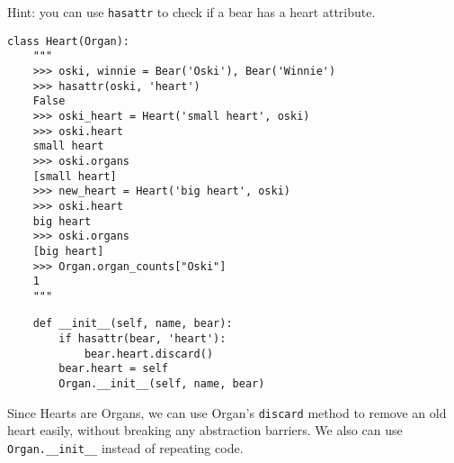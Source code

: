 \begin{parts}
\begin{blocksection}
Hint: you can use \lstinline{hasattr} to check if a bear has a heart attribute.

\begin{lstlisting}
class Heart(Organ):
    """
    >>> oski, winnie = Bear('Oski'), Bear('Winnie')
    >>> hasattr(oski, 'heart')
    False
    >>> oski_heart = Heart('small heart', oski)
    >>> oski.heart
    small heart
    >>> oski.organs
    [small heart]
    >>> new_heart = Heart('big heart', oski)
    >>> oski.heart
    big heart
    >>> oski.organs
    [big heart]
    >>> Organ.organ_counts["Oski"]
    1
    """
\end{lstlisting}

\begin{solution}[2in]
\begin{lstlisting}
    def __init__(self, name, bear):
        if hasattr(bear, 'heart'):
            bear.heart.discard()
        bear.heart = self
        Organ.__init__(self, name, bear)
\end{lstlisting}
Since Hearts are Organs, we can use Organ's \lstinline{discard} method to remove an old heart easily, without breaking any abstraction barriers. We also can use \lstinline{Organ.__init__} instead of repeating code.
\end{solution}
\end{blocksection}





\end{parts}
